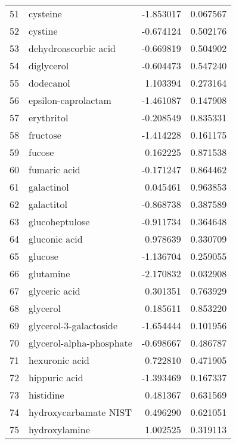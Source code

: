 \begin{tabular}{llrr}
51  &                           cysteine & -1.853017 &  0.067567 \\
52  &                            cystine & -0.674124 &  0.502176 \\
53  &               dehydroascorbic acid & -0.669819 &  0.504902 \\
54  &                         diglycerol & -0.604473 &  0.547240 \\
55  &                          dodecanol &  1.103394 &  0.273164 \\
56  &                epsilon-caprolactam & -1.461087 &  0.147908 \\
57  &                         erythritol & -0.208549 &  0.835331 \\
58  &                           fructose & -1.414228 &  0.161175 \\
59  &                             fucose &  0.162225 &  0.871538 \\
60  &                       fumaric acid & -0.171247 &  0.864462 \\
61  &                         galactinol &  0.045461 &  0.963853 \\
62  &                         galactitol & -0.868738 &  0.387589 \\
63  &                     glucoheptulose & -0.911734 &  0.364648 \\
64  &                      gluconic acid &  0.978639 &  0.330709 \\
65  &                            glucose & -1.136704 &  0.259055 \\
66  &                          glutamine & -2.170832 &  0.032908 \\
67  &                      glyceric acid &  0.301351 &  0.763929 \\
68  &                           glycerol &  0.185611 &  0.853220 \\
69  &             glycerol-3-galactoside & -1.654444 &  0.101956 \\
70  &           glycerol-alpha-phosphate & -0.698667 &  0.486787 \\
71  &                     hexuronic acid &  0.722810 &  0.471905 \\
72  &                      hippuric acid & -1.393469 &  0.167337 \\
73  &                          histidine &  0.481367 &  0.631569 \\
74  &              hydroxycarbamate NIST &  0.496290 &  0.621051 \\
75  &                      hydroxylamine &  1.002525 &  0.319113 \\

\end{tabular}
